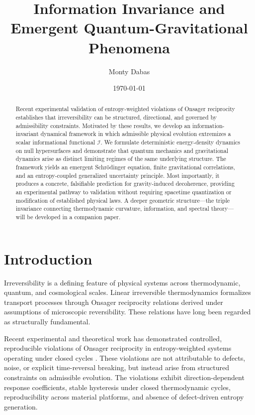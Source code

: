 \documentclass[prd,10pt,twocolumn]{revtex4-2}
\newcommand{\cI}{\mathcal{I}}
\begin{document}
\title{Information Invariance and Emergent Quantum-Gravitational Phenomena}

\author{Monty Dabas}

\date{\today}

\begin{abstract}
Recent experimental validation of entropy-weighted violations of Onsager reciprocity \cite{Dabas2024preprint} establishes that irreversibility can be structured, directional, and governed by admissibility constraints. Motivated by these results, we develop an information-invariant dynamical framework in which admissible physical evolution extremizes a scalar informational functional $\cI$. We formulate deterministic energy-density dynamics on null hypersurfaces and demonstrate that quantum mechanics and gravitational dynamics arise as distinct limiting regimes of the same underlying structure. The framework yields an emergent Schr\"odinger equation, finite gravitational correlations, and an entropy-coupled generalized uncertainty principle. Most importantly, it produces a concrete, falsifiable prediction for gravity-induced decoherence, providing an experimental pathway to validation without requiring spacetime quantization or modification of established physical laws. A deeper geometric structure—the triple invariance connecting thermodynamic curvature, information, and spectral theory—will be developed in a companion paper.
\end{abstract}

\maketitle

\section{Introduction}
\label{sec:intro}

Irreversibility is a defining feature of physical systems across thermodynamic, quantum, and cosmological scales. Linear irreversible thermodynamics formalizes transport processes through Onsager reciprocity relations derived under assumptions of microscopic reversibility. These relations have long been regarded as structurally fundamental.

Recent experimental and theoretical work has demonstrated controlled, reproducible violations of Onsager reciprocity in entropy-weighted systems operating under closed cycles \cite{Dabas2024preprint}. These violations are not attributable to defects, noise, or explicit time-reversal breaking, but instead arise from structured constraints on admissible evolution. The violations exhibit direction-dependent response coefficients, stable hysteresis under closed thermodynamic cycles, reproducibility across material platforms, and absence of defect-driven entropy generation.
\end{document}
